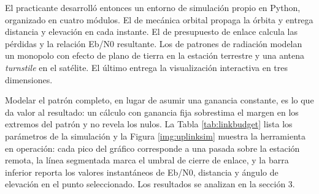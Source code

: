 El practicante desarrolló entonces un entorno de simulación propio en Python, organizado en cuatro módulos. El de mecánica orbital propaga la órbita y entrega distancia y elevación en cada instante. El de presupuesto de enlace calcula las pérdidas y la relación Eb/N0 resultante. Los de patrones de radiación modelan un monopolo con efecto de plano de tierra en la estación terrestre y una antena \textit{turnstile} en el satélite. El último entrega la visualización interactiva en tres dimensiones.

Modelar el patrón completo, en lugar de asumir una ganancia constante, es lo que da valor al resultado: un cálculo con ganancia fija sobrestima el margen en los extremos del patrón y no revela los nulos. La Tabla \ref{tab:linkbudget} lista los parámetros de la simulación y la Figura \ref{img:uplinksim} muestra la herramienta en operación: cada pico del gráfico corresponde a una pasada sobre la estación remota, la línea segmentada marca el umbral de cierre de enlace, y la barra inferior reporta los valores instantáneos de Eb/N0, distancia y ángulo de elevación en el punto seleccionado. Los resultados se analizan en la sección 3.

